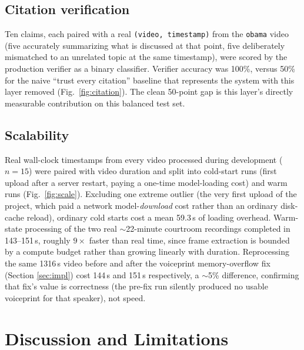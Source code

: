 \documentclass[3p,times,procedia]{elsarticle}
\begin{document}
\subsection{Citation verification}

Ten claims, each paired with a real \texttt{(video, timestamp)} from the \texttt{obama}
video (five accurately summarizing what is discussed at that point, five deliberately
mismatched to an unrelated topic at the same timestamp), were scored by the production
verifier as a binary classifier. Verifier accuracy was 100\%, versus 50\% for the naive
``trust every citation'' baseline that represents the system with this layer removed
(Fig.~\ref{fig:citation}). The clean 50-point gap is this layer's directly
measurable contribution on this balanced test set.

\subsection{Scalability}

Real wall-clock timestamps from every video processed during development ($n=15$) were
paired with video duration and split into cold-start runs (first upload after a server
restart, paying a one-time model-loading cost) and warm runs (Fig.~\ref{fig:scale}).
Excluding one extreme outlier (the very first upload of the project, which paid a
network model-\emph{download} cost rather than an ordinary disk-cache reload), ordinary
cold starts cost a mean 59.3\,s of loading overhead. Warm-state processing of the two
real $\sim$22-minute courtroom recordings completed in 143--151\,s, roughly $9\times$
faster than real time, since frame extraction is bounded by a compute budget rather
than growing linearly with duration. Reprocessing the same 1316\,s video before and
after the voiceprint memory-overflow fix (Section \ref{sec:impl}) cost 144\,s and
151\,s respectively, a $\sim$5\% difference, confirming that fix's value is
correctness (the pre-fix run silently produced no usable voiceprint for that speaker),
not speed.

\section{Discussion and Limitations}
\label{sec:discussion}
\end{document}
